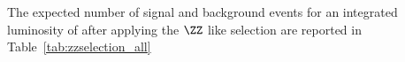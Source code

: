 
The expected number of signal and background events for an integrated 
luminosity of \intlumi after applying the $\ZZ$ like selection are reported in 
Table~\ref{tab:zzselection_all}


